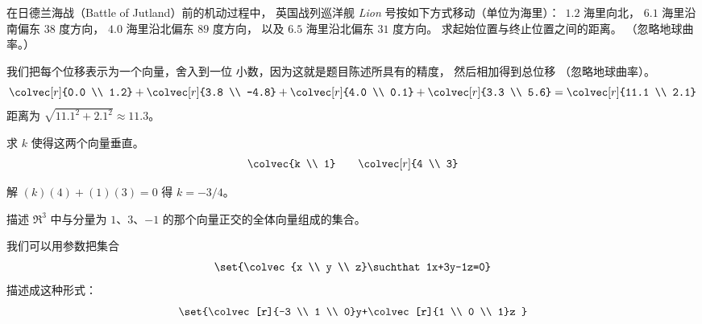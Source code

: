 \begin{exercises}
    在日德兰海战（Battle of Jutland）前的机动过程中，
    英国战列巡洋舰 \textit{Lion} 号按如下方式移动（单位为海里）：~\( 1.2 \) 海里向北，
    \( 6.1 \) 海里沿南偏东 \( 38 \) 度方向，
    \( 4.0 \) 海里沿北偏东 \( 89 \) 度方向，
    以及 \( 6.5 \) 海里沿北偏东 \( 31 \) 度方向。
    求起始位置与终止位置之间的距离。
    （忽略地球曲率。）
    \begin{answer}
      我们把每个位移表示为一个向量，舍入到一位
      小数，因为这就是题目陈述所具有的精度，
      然后相加得到总位移 
      （忽略地球曲率）。
      \begin{equation*}
        \colvec[r]{0.0 \\ 1.2}
        +\colvec[r]{3.8 \\ -4.8}
        +\colvec[r]{4.0 \\ 0.1}
        +\colvec[r]{3.3 \\ 5.6}
        =\colvec[r]{11.1 \\ 2.1}
      \end{equation*}
      距离为 \( \sqrt{11.1^2+2.1^2}\approx 11.3 \)。  
    \end{answer}
  \item 
    求 \( k \) 使得这两个向量垂直。
    \begin{equation*}
       \colvec{k \\ 1}
       \qquad
       \colvec[r]{4 \\ 3}
    \end{equation*}
    \begin{answer}
       解 \( (k)(4)+(1)(3)=0 \) 得 \( k=-3/4 \)。  
    \end{answer}
  \item 
    描述 \( \Re^3 \) 中与分量为 $1$、$3$、$-1$
    的那个向量正交的全体向量组成的集合。
    \begin{answer}
      我们可以用参数把集合
      \begin{equation*}
         \set{\colvec{x \\ y \\ z}\suchthat 1x+3y-1z=0}
      \end{equation*}
      描述成这种形式：
      \begin{equation*}
         \set{\colvec[r]{-3 \\ 1 \\ 0}y+\colvec[r]{1 \\ 0 \\ 1}z
}
\end{equation*}
\end{answer}
\end{exercises}
